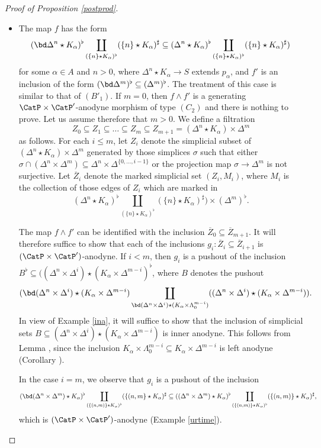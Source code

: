 \begin{proof}[Proof of Proposition \ref{postprod}]
\begin{itemize}
\item[$(C'_2)$]  The map $f$ has the form 
$$ ( \bd \Delta^n \star K_{\alpha})^{\flat} \coprod_{ ( \{n\} \star K_{\alpha})^{\flat} }
( \{n\} \star K_{\alpha})^{\sharp} \subseteq 
( \Delta^n \star K_{\alpha})^{\flat} \coprod_{ ( \{n\} \star K_{\alpha})^{\flat} }
( \{n\} \star K_{\alpha} )^{\sharp} )$$
for some $\alpha \in A$ and $n > 0$, where $\Delta^n \star K_{\alpha} \rightarrow S$
extends $p_{\alpha}$, and $f'$ is an inclusion of the form $(\bd \Delta^m)^{\flat}
\subseteq (\Delta^m)^{\flat}$. The treatment of this case is similar to that of $(B'_1)$.
If $m=0$, then $f \wedge f'$ is a generating $\CatP \times \CatP'$-anodyne morphism of type $(C_2)$ and there is nothing to prove. Let us assume
therefore that $m > 0$. We define a filtration 
$$ Z_0 \subseteq Z_1 \subseteq \ldots \subseteq Z_m \subseteq Z_{m+1} = ( \Delta^n \star K_{\alpha}) \times \Delta^m$$ as follows. For each $i \leq m$, let $Z_i$ denote the simplicial subset of
$( \Delta^n \star K_{\alpha}) \times \Delta^m$ generated by those simplices $\sigma$ such that
either $\sigma \cap ( \Delta^n \times \Delta^m) \subseteq \Delta^n \times \Delta^{ \{0, \ldots, i-1 \} }$ or
the projection map $\sigma \rightarrow \Delta^m$ is not surjective. Let $\overline{Z}_i$ denote the
marked simplicial set $(Z_i, M_i)$, where $M_i$ is the collection of those edges of $Z_i$ which are marked in $$( \Delta^n \star K_{\alpha})^{\flat} \coprod_{ ( \{n\} \star K_{\alpha})^{\flat} }
( \{n\} \star K_{\alpha} )^{\sharp} ) \times (\Delta^m)^{\flat}.$$

The map $f \wedge f'$ can be identified with the inclusion
$\overline{Z}_0 \subseteq \overline{Z}_{m+1}$. It will therefore suffice to show that each of the inclusions $g_i: \overline{Z}_i \subseteq \overline{Z}_{i+1}$ is $(\CatP \times \CatP')$-anodyne. If $i < m$, then
$g_i$ is a pushout of the inclusion $B^{\flat} \subseteq ( (\Delta^n \times \Delta^{i}) \star (K_{\alpha} \times \Delta^{m-i} )^{\flat}$, where $B$ denotes the pushout 
$$(\bd (\Delta^n \times \Delta^i) \star (K_{\alpha} \times \Delta^{m-i})
\coprod_{ \bd(\Delta^n \times \Delta^i) \star (K_{\alpha} \times \Lambda^{m-i}_0)}
( (\Delta^n \times \Delta^i) \star (K_{\alpha} \times \Delta^{m-i} ) ).$$
In view of Example \ref{ina}, it will suffice to show that the inclusion of simplicial sets
$B \subseteq (\Delta^n \times \Delta^i) \star (K_{\alpha} \times \Delta^{m-i})$ is inner anodyne. This follows from Lemma , since the inclusion $K_{\alpha} \times \Lambda^{m-i}_0
\subseteq K_{\alpha} \times \Delta^{m-i}$ is left anodyne (Corollary ).

In the case $i=m$, we observe that $g_i$ is a pushout of the inclusion
$$ (\bd( \Delta^n \times \Delta^m) \star K_{\alpha})^{\flat}
\coprod_{ (\{(n,m)\} \star K_{\alpha})^{\flat} }
( \{(n,m\} \star K_{\alpha} )^{\sharp} 
\subseteq ( (\Delta^n \times \Delta^m) \star K_{\alpha})^{\flat} \coprod_{ (\{(n,m)\} \star K_{\alpha})^{\flat} }
( \{(n,m)\} \star K_{\alpha} )^{\sharp},$$
which is $(\CatP \times \CatP')$-anodyne (Example \ref{urtime}).
\end{itemize}
\end{proof}

